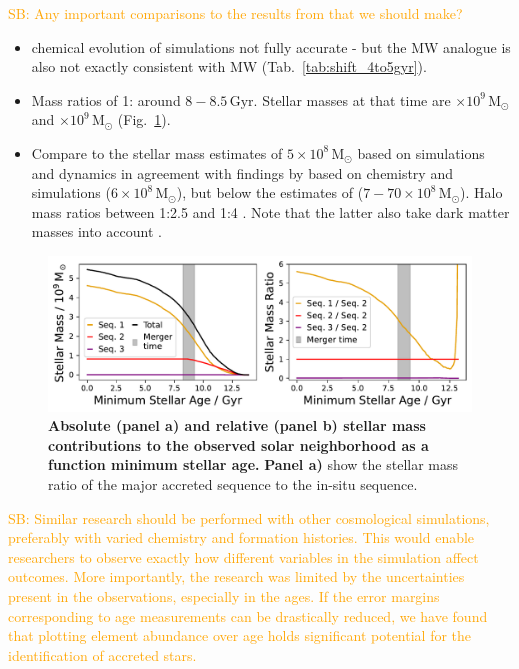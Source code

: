 \documentclass[fleqn,usenatbib]{mnras}
\newcommand{\SB}[1]{{\textcolor{orange}{SB: #1}}}
\begin{document}
\SB{Any important comparisons to the results from \citet{Buck2023} that we should make?}

\begin{itemize}
    \item chemical evolution of simulations not fully accurate - but the MW analogue is also not exactly consistent with MW (Tab.~\ref{tab:shift_4to5gyr}).
    \item Mass ratios of 1: around $8-8.5\,\mathrm{Gyr}$. Stellar masses at that time are $\times10^9\,\mathrm{M_\odot}$ and $\times10^9\,\mathrm{M_\odot}$
    (Fig.~\ref{fig:sequence_mass_ratios}).
    \item Compare to the stellar mass estimates of $5\times10^{8}\,\mathrm{M_\odot}$ based on simulations and dynamics \citep{Naidu2021} in agreement with findings by \citet{Helmi2018} based on chemistry and simulations ($6\times 10^{8}\,\mathrm{M_\odot}$), but below the estimates of \citet{Feuillet2020} ($7-70\times10^{8}\,\mathrm{M_\odot}$). Halo mass ratios between 1:2.5 \citep{Naidu2020} and 1:4 \cite{Helmi2018}. Note that the latter also take dark matter masses into account \citep[e.g. $2\times10^{11}\,\mathrm{M_\odot}$ for][]{Naidu2020}.
\end{itemize}

\begin{figure}
	\includegraphics[width=\columnwidth]{figures/sequence_mass_ratios.pdf}
    \caption{
    \textbf{Absolute (panel a) and relative (panel b) stellar mass contributions to the observed solar neighborhood as a function minimum stellar age.}
    \textbf{Panel a)} show the stellar mass ratio of the major accreted sequence to the in-situ sequence.
    }
    \label{fig:sequence_mass_ratios}
\end{figure}



\SB{Similar research should be performed with other cosmological simulations, preferably with varied chemistry and formation histories. This would enable researchers to observe exactly how different variables in the simulation affect outcomes. More importantly, the research was limited by the uncertainties present in the observations, especially in the ages. If the error margins corresponding to age measurements can be drastically reduced, we have found that plotting element abundance over age holds significant potential for the identification of accreted stars.}
\end{document}

